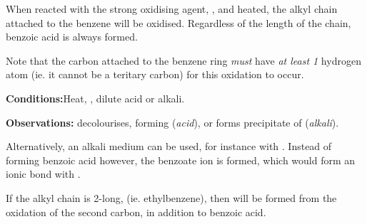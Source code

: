 				When reacted with the strong oxidising agent, , and heated, the alkyl chain attached to the benzene will be oxidised.
				Regardless of the length of the chain, benzoic acid is always formed.

				Note that the carbon attached to the benzene ring \textit{must} have \textit{at least 1} hydrogen atom (ie. it cannot be a
				teritary carbon) for this oxidation to occur.

				\vspace{1.5em}

				\vbox{\textbf{Conditions:}\tabto{35mm}Heat, , dilute acid or alkali.}

				\vspace{0.75em}
				\vbox{\textbf{Observations:}\tabto{35mm}  decolourises, forming  (\textit{acid}), or
											\tabto{35mm}forms  precipitate of  (\textit{alkali}).}



				Alternatively, an alkali medium can be used, for instance with . Instead of forming benzoic acid however, the
				benzoate ion is formed, which would form an ionic bond with .





				\pagebreak
				If the alkyl chain is 2-long, (ie. ethylbenzene), then  will be formed from the oxidation of the second carbon,
				in addition to benzoic acid.


